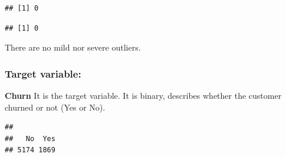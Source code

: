 \documentclass[
  twoside]{article}
\newenvironment{Shaded}{\begin{snugshade}}{\end{snugshade}}
\newcommand{\CommentTok}[1]{\textcolor[rgb]{0.56,0.35,0.01}{\textit{#1}}}
\newcommand{\DecValTok}[1]{\textcolor[rgb]{0.00,0.00,0.81}{#1}}
\newcommand{\FunctionTok}[1]{\textcolor[rgb]{0.00,0.00,0.00}{#1}}
\newcommand{\NormalTok}[1]{#1}
\newcommand{\OtherTok}[1]{\textcolor[rgb]{0.56,0.35,0.01}{#1}}
\newcommand{\SpecialCharTok}[1]{\textcolor[rgb]{0.00,0.00,0.00}{#1}}
\newcommand{\StringTok}[1]{\textcolor[rgb]{0.31,0.60,0.02}{#1}}
\begin{document}
\begin{verbatim}
## [1] 0
\end{verbatim}

\begin{Shaded}
\end{Shaded}

\begin{verbatim}
## [1] 0
\end{verbatim}

There are no mild nor severe outliers.

\hypertarget{target-variable}{%
\subsubsection{Target variable:}\label{target-variable}}

\textbf{Churn} It is the target variable. It is binary, describes
whether the customer churned or not (Yes or No).

\begin{Shaded}
\end{Shaded}

\begin{verbatim}
## 
##   No  Yes 
## 5174 1869
\end{verbatim}

\begin{Shaded}
\end{Shaded}
\end{document}
